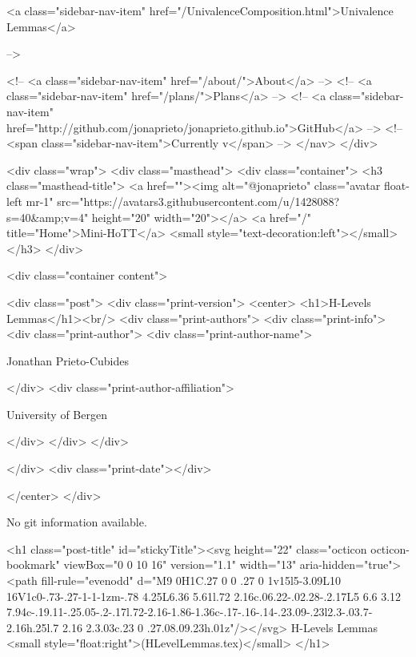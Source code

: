       
    
      
        
          <a class="sidebar-nav-item" href="/UnivalenceComposition.html">Univalence Lemmas</a>
        
      
     -->

    <!-- <a class="sidebar-nav-item" href="/about/">About</a> -->
    <!-- <a class="sidebar-nav-item" href="/plans/">Plans</a> -->
    <!-- <a class="sidebar-nav-item" href="http://github.com/jonaprieto/jonaprieto.github.io">GitHub</a> -->
    <!-- <span class="sidebar-nav-item">Currently v</span> -->
  </nav>
</div>

    <div class="wrap">
      <div class="masthead">
        <div class="container">
          <h3 class="masthead-title">
            <a href=""><img alt="@jonaprieto" class="avatar float-left mr-1" src="https://avatars3.githubusercontent.com/u/1428088?s=40&amp;v=4" height="20" width="20"></a>
            <a href="/" title="Home">Mini-HoTT</a>
            <small style="text-decoration:left"></small>
          </h3>
        </div>
      
      <div class="container content">
        







<div class="post">
  <div class="print-version">
    <center>
      <h1>H-Levels Lemmas</h1><br/>
        <div class="print-authors">
          <div class="print-info">
            <div class="print-author">
              <div class="print-author-name">
                
                  Jonathan Prieto-Cubides
                
              </div>
              <div class="print-author-affiliation">
                
                  University of Bergen
                
                </div>
            </div>
          </div>
          
          
        </div>
        <div class="print-date"></div>
        
        
    </center>
  </div>

  
  No git information available.
  

  <h1 class="post-title" id="stickyTitle"><svg height="22" class="octicon octicon-bookmark" viewBox="0 0 10 16" version="1.1" width="13" aria-hidden="true"><path fill-rule="evenodd" d="M9 0H1C.27 0 0 .27 0 1v15l5-3.09L10 16V1c0-.73-.27-1-1-1zm-.78 4.25L6.36 5.61l.72 2.16c.06.22-.02.28-.2.17L5 6.6 3.12 7.94c-.19.11-.25.05-.2-.17l.72-2.16-1.86-1.36c-.17-.16-.14-.23.09-.23l2.3-.03.7-2.16h.25l.7 2.16 2.3.03c.23 0 .27.08.09.23h.01z"/></svg> H-Levels Lemmas <small style="float:right">(HLevelLemmas.tex)</small>
  </h1>

